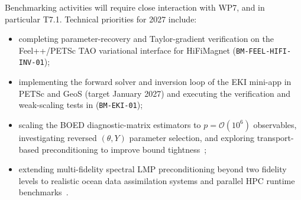 Benchmarking activities will require close interaction with WP7, and in particular T7.1.
Technical priorities for 2027 include:
\begin{itemize}
\item completing parameter-recovery and Taylor-gradient verification on the
  Feel++/PETSc TAO variational interface for HiFiMagnet (\nolinkurl{BM-FEEL-HIFI-INV-01});
\item implementing the forward solver and inversion loop of the EKI mini-app in
  PETSc and GeoS (target January 2027) and executing the verification and
  weak-scaling tests in  (\nolinkurl{BM-EKI-01});
\item scaling the BOED diagnostic-matrix estimators to $p = \mathcal{O}(10^6)$
  observables, investigating reversed $(\theta, Y)$ parameter selection, and
  exploring transport-based preconditioning to improve bound tightness~\cite{hal-05768497};
\item extending multi-fidelity spectral LMP preconditioning beyond two fidelity
  levels to realistic ocean data assimilation systems and parallel HPC runtime
  benchmarks~\cite{hal-05874752}.

\end{itemize}
